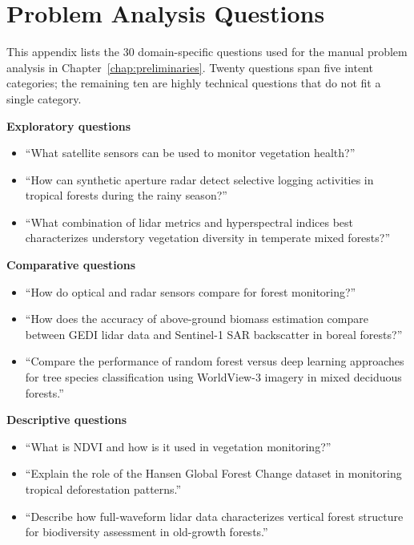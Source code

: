 
\chapter{Problem Analysis Questions}\label{app:analysis-questions}

This appendix lists the 30 domain-specific questions used for the manual
problem analysis in Chapter~\ref{chap:preliminaries}. Twenty questions
span five intent categories; the remaining ten are highly technical
questions that do not fit a single category.

\medskip
\noindent\textbf{Exploratory questions}
\begin{itemize}
\item ``What satellite sensors can be used to monitor vegetation health?''
\item ``How can synthetic aperture radar detect selective logging activities in tropical forests during the rainy season?''
\item ``What combination of lidar metrics and hyperspectral indices best characterizes understory vegetation diversity in temperate mixed forests?''
\end{itemize}

\noindent\textbf{Comparative questions}
\begin{itemize}
\item ``How do optical and radar sensors compare for forest monitoring?''
\item ``How does the accuracy of above-ground biomass estimation compare between GEDI lidar data and Sentinel-1 SAR backscatter in boreal forests?''
\item ``Compare the performance of random forest versus deep learning approaches for tree species classification using WorldView-3 imagery in mixed deciduous forests.''
\end{itemize}

\noindent\textbf{Descriptive questions}
\begin{itemize}
\item ``What is NDVI and how is it used in vegetation monitoring?''
\item ``Explain the role of the Hansen Global Forest Change dataset in monitoring tropical deforestation patterns.''
\item ``Describe how full-waveform lidar data characterizes vertical forest structure for biodiversity assessment in old-growth forests.''
\end{itemize}

